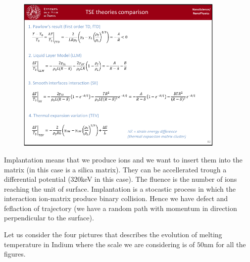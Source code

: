 \documentclass[../main/main.tex]{subfiles}
\begin{document}
\begin{figure}[h!]
\centering
\includegraphics[page=2,width=0.9\textwidth]{../lessons/pdf_file/5_lesson.pdf}
\end{figure}

Implantation means that we produce ions and we want to insert them into the matrix (in this case is a silica matrix). They can be accellerated trough a differential potential (320keV in this case). The fluence is the number of ions reaching the unit of surface.
Implantation is a stocastic process in which the interaction ion-matrix produce binary collision. Hence we have defect and feflaction of trajectory (we have a random path with momentum in direction perpendicular to the surface).

Let us consider the four pictures that describes the evolution of melting temperature in Indium where the scale we are considering is of \( 50 \)nm for all the figures.
\end{document}
